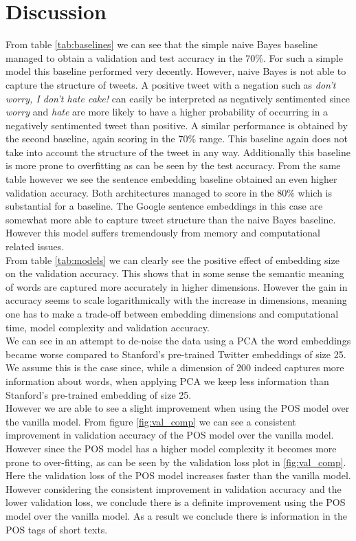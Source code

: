 \documentclass[conference]{IEEEtran}
\begin{document}
\section{Discussion}
\label{sec:discussion}
From table \ref{tab:baselines} we can see that the simple naive Bayes baseline managed to obtain a validation and test accuracy in the 70\%. For such a simple model this baseline performed very decently. However, naive Bayes is not able to capture the structure of tweets. A positive tweet with a negation such as \textit{don't worry, I don't hate cake!} can easily be interpreted as negatively sentimented since \textit{worry} and \textit{hate} are more likely to have a higher probability of occurring in a negatively sentimented tweet than positive. A similar performance is obtained by the second baseline, again scoring in the 70\% range. This baseline again does not take into account the structure of the tweet in any way. Additionally this baseline is more prone to overfitting as can be seen by the test accuracy. From the same table however we see the sentence embedding baseline obtained an even higher validation accuracy. Both architectures managed to score in the 80\% which is substantial for a baseline. The Google sentence embeddings in this case are somewhat more able to capture tweet structure than the naive Bayes baseline. However this model suffers tremendously from memory and computational related issues.\\
\indent From table \ref{tab:models} we can clearly see the positive effect of embedding size on the validation accuracy. This shows that in some sense the semantic meaning of words are captured more accurately in higher dimensions. However the gain in accuracy seems to scale logarithmically with the increase in dimensions, meaning one has to make a trade-off between embedding dimensions and computational time, model complexity and validation accuracy.\\
\indent We can see in an attempt to de-noise the data using a PCA the word embeddings became worse compared to Stanford's pre-trained Twitter embeddings of size 25. We assume this is the case since, while a dimension of 200 indeed captures more information about words, when applying PCA we keep less information than Stanford's pre-trained embedding of size 25.\\
\indent However we are able to see a slight improvement when using the POS model over the vanilla model. From figure \ref{fig:val_comp} we can see a consistent improvement in validation accuracy of the POS model over the vanilla model. However since the POS model has a higher model complexity it becomes more prone to over-fitting, as can be seen by the validation loss plot in \ref{fig:val_comp}. Here the validation loss of the POS model increases faster than the vanilla model. However considering the consistent improvement in validation accuracy and the lower validation loss, we conclude there is a definite improvement using the POS model over the vanilla model. As a result we conclude there is information in the POS tags of short texts.
\end{document}
